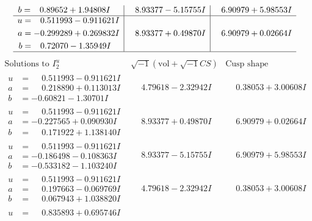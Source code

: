 \documentclass[1p]{elsarticle_modified}
\theoremstyle{definition}
\newcommand{\I}{\sqrt{-1}}
\begin{document}
$$\begin{array}{c|c|c}
\begin{aligned}
b &= \phantom{-}0.89652 + 1.94808 I\end{aligned}
 & \phantom{-}8.93377 - 5.15755 I & \phantom{-}6.90979 + 5.98553 I \\ \hline\begin{aligned}
u &= \phantom{-}0.511993 - 0.911621 I \\
a &= -0.299289 + 0.269832 I \\
b &= \phantom{-}0.72070 - 1.35949 I\end{aligned}
 & \phantom{-}8.93377 + 0.49870 I & \phantom{-}6.90979 + 0.02664 I\\
 \hline 
 \end{array}$$\newpage$$\begin{array}{c|c|c}  
\text{Solutions to }I^u_{2}& \I (\text{vol} + \sqrt{-1}CS) & \text{Cusp shape}\\
 \hline 
\begin{aligned}
u &= \phantom{-}0.511993 - 0.911621 I \\
a &= \phantom{-}0.218890 + 0.113013 I \\
b &= -0.60821 - 1.30701 I\end{aligned}
 & \phantom{-}4.79618 - 2.32942 I & \phantom{-}0.38053 + 3.00608 I \\ \hline\begin{aligned}
u &= \phantom{-}0.511993 - 0.911621 I \\
a &= -0.227565 + 0.090930 I \\
b &= \phantom{-}0.171922 + 1.138140 I\end{aligned}
 & \phantom{-}8.93377 + 0.49870 I & \phantom{-}6.90979 + 0.02664 I \\ \hline\begin{aligned}
u &= \phantom{-}0.511993 - 0.911621 I \\
a &= -0.186498 - 0.108363 I \\
b &= -0.533182 - 1.103240 I\end{aligned}
 & \phantom{-}8.93377 - 5.15755 I & \phantom{-}6.90979 + 5.98553 I \\ \hline\begin{aligned}
u &= \phantom{-}0.511993 - 0.911621 I \\
a &= \phantom{-}0.197663 - 0.069769 I \\
b &= \phantom{-}0.067943 + 1.038820 I\end{aligned}
 & \phantom{-}4.79618 - 2.32942 I & \phantom{-}0.38053 + 3.00608 I \\ \hline\begin{aligned}
u &= \phantom{-}0.835893 + 0.695746 I \\

\end{aligned}
\end{array}$$
\end{document}

